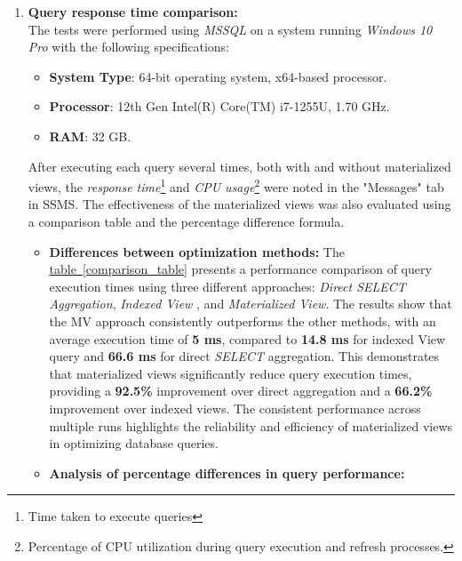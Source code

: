  

\begin{enumerate}


    \item \textbf{ Query response time comparison:}\\
The tests were performed using \textit{MSSQL} on a system running \textit{Windows 10 Pro} with the following specifications:
\begin{itemize}
    \item \textbf{System Type}: 64-bit operating system, x64-based processor.
    \item \textbf{Processor}: 12th Gen Intel(R) Core(TM) i7-1255U, 1.70 GHz.
    \item \textbf{RAM}: 32 GB.
\end{itemize}\vspace{.4cm}
After executing each query several times, both with and without materialized views, the \textit{response time}\footnote{Time taken to execute queries} and \textit{CPU usage}\footnote{Percentage of CPU utilization during query execution and refresh processes.} were noted in the "Messages" tab in SSMS. The effectiveness of the materialized views was also evaluated using a comparison table and the percentage difference formula.

\begin{itemize}
\item\textbf{Differences between optimization methods:} The \hyperref[comparison_table]{table~\ref*{comparison_table}} presents a performance comparison of query execution times using three different approaches: \textit{Direct SELECT Aggregation}, \textit{Indexed View }, and \textit{Materialized View}. The results show that the MV approach consistently outperforms the other methods, with an average execution time of \textbf{5 ms}, compared to \textbf{14.8 ms} for indexed View query and \textbf{66.6 ms} for direct \textit{SELECT} aggregation. This demonstrates that materialized views significantly reduce query execution times, providing a \textbf{92.5\%} improvement over direct aggregation and a \textbf{66.2\%} improvement over indexed views. The consistent performance across multiple runs highlights the reliability and efficiency of materialized views in optimizing database queries.\vspace{.4cm}
 
 \vspace{.4cm
 }

 \item\textbf{Analysis of percentage differences in query performance:}
 

\end{itemize}
\end{enumerate}
